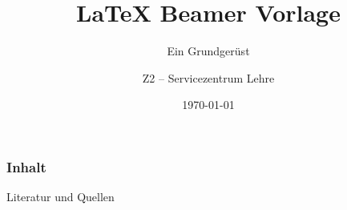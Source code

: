 \documentclass[ngerman,hyperref={bookmarks},xcolor={table,dvipsnames},aspectratio=169,usepdftitle=false]{beamer}%
\title[\LaTeX{} Beamer Vorlage -- Ein Grundgerüst]{\LaTeX{} Beamer Vorlage}
\subtitle{Ein Grundgerüst}
\author[Z2 -- ELC]{Z2 -- Servicezentrum Lehre}
\date{\today}
\begin{document}
\begin{frame}[plain]
    \titlepage
\end{frame}

\begin{frame}
    \frametitle{Inhalt}
    \tableofcontents
\end{frame}


\begin{frame}[t]{Literatur und Quellen}
    \printbibliography%
\end{frame}


\end{document}
